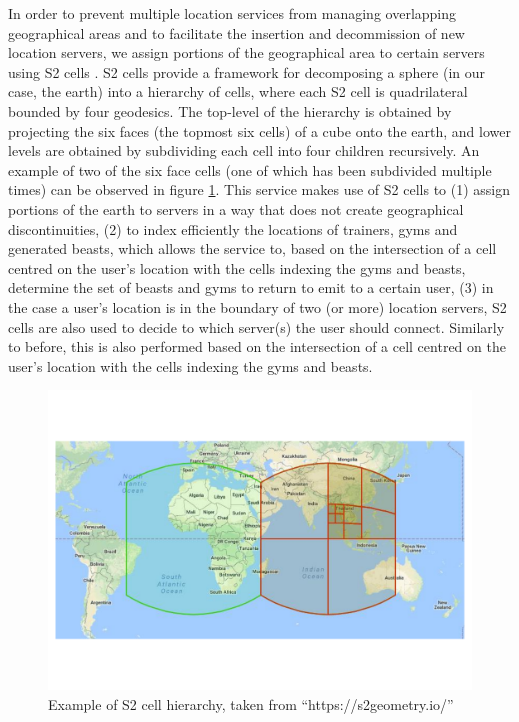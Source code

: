 In order to prevent multiple location services from managing overlapping geographical areas and to facilitate the insertion and decommission of new location servers, we assign portions of the geographical area to certain servers using S2 cells \cite{s2geometry}. S2 cells provide a framework for decomposing a sphere (in our case, the earth) into a hierarchy of cells, where each S2 cell is quadrilateral bounded by four geodesics. The top-level of the hierarchy is obtained by projecting the six faces (the topmost six cells) of a cube onto the earth, and lower levels are obtained by subdividing each cell into four children recursively. An example of two of the six face cells (one of which has been subdivided multiple times) can be observed in figure \ref{fig:pouchbeasts-s2cells}. This service makes use of S2 cells to (1) assign portions of the earth to servers in a way that does not create geographical discontinuities, (2) to index efficiently the locations of trainers, gyms and generated beasts, which allows the service to, based on the intersection of a cell centred on the user's location with the cells indexing the gyms and beasts, determine the set of beasts and gyms to return to emit to a certain user, (3) in the case a user's location is in the boundary of two (or more) location servers, S2 cells are also used to decide to which server(s) the user should connect. Similarly to before, this is also performed based on the intersection of a cell centred on the user's location with the cells indexing the gyms and beasts.

\begin{figure}[htbp]
    \centering
    \includegraphics[width=\textwidth]{Chapters/benchmark/figures/s2_cells.pdf}
    \caption{Example of S2 cell hierarchy, taken from ``https://s2geometry.io/''}
    \label{fig:pouchbeasts-s2cells}
\end{figure}

